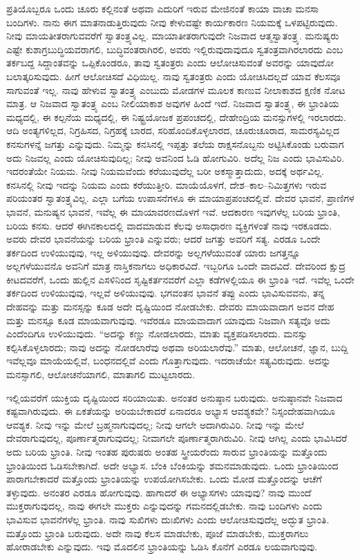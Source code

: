 ಪ್ರತಿಯೊಬ್ಬರೂ ಒಂದು ಚೂರು ಕಲ್ಲಿನಂತೆ ಅಥವಾ ಎದುರಿಗೆ ಇರುವ ಮೇಜಿನಂತೆ ಕಾಯಾ ವಾಚಾ ಮನಸಾ ಬಂದಿಗಳು. ನಾನು ಈಗ ಮಾತನಾಡುತ್ತಿರುವುದು ನೀವು ಕೇಳುವಷ್ಟೇ ಕಾರ್ಯಕಾರಣ ನಿಯಮಕ್ಕೆ ಒಳಪಟ್ಟಿರುವುದು. ನೀವು ಮಾಯತೀತರಾಗುವವರೆಗೆ ಸ್ವಾತಂತ್ರ್ಯವಿಲ್ಲ. ಮಾಯಾತೀತರಾಗುವುದೇ ನಿಜವಾದ ಆತ್ಮಸ್ವಾತಂತ್ರ್ಯ. ಮನುಷ್ಯರು ಎಷ್ಟೇ ಕುಶಾಗ್ರಬುದ್ಧಿಯವರಾಗಲಿ, ಬುದ್ಧಿವಂತರಾಗಿರಲಿ, ಅವರು ಇಲ್ಲಿರುವುದಾವುದೂ ಸ್ವತಂತ್ರವಾಗಿರಲಾರದು ಎಂಬ ತರ್ಕಬದ್ದ ಸಿದ್ದಾಂತವನ್ನು ಒಪ್ಪಿಕೊಂಡರೂ, ತಾವು ಸ್ವತಂತ್ರರು ಎಂದು ಆಲೋಚಿಸುವಂತೆ ಅವರನ್ನು ಯಾವುದೋ ಬಲಾತ್ಕರಿಸುವುದು. ಹೀಗೆ ಆಲೋಚಿಸದೆ ವಿಧಿಯಿಲ್ಲ. ನಾವು ಸ್ವತಂತ್ರರು ಎಂದು ಯೋಚಿಸಿದಲ್ಲದೆ ಯಾವ ಕೆಲಸವೂ ಸಾಗುವಂತೆ ಇಲ್ಲ. ನಾವು ಹೇಳುವ ಸ್ವಾತಂತ್ರ್ಯ ಎಂಬುದು ಮೋಡಗಳ ಮೂಲಕ ಕಾಣುವ ನೀಲಾಕಾಶದ ಕ್ಷಣಿಕ ನೋಟ ಮಾತ್ರ. ಆ ನಿಜವಾದ ಸ್ವಾತಂತ್ರ್ಯ ಎಂಬ ನೀಲಿಯಾಕಾಶ ಅವುಗಳ ಹಿಂದೆ ಇದೆ. ನಿಜವಾದ ಸ್ವಾತಂತ್ರ್ಯ, ಈ ಭ್ರಾಂತಿಯ ಮಧ್ಯದಲ್ಲಿ, ಈ ಕಲ್ಪನೆಯ ಮಧ್ಯದಲ್ಲಿ, ಈ ನಿಷ್ಟ್ರಯೋಜಕ ಪ್ರಪಂಚದಲ್ಲಿ, ದೇಹೇಂದ್ರಿಯ ಮನಸ್ಸುಗಳಲ್ಲಿ ಇರಲಾರದು. ಆದಿ ಅಂತ್ಯಗಳಿಲ್ಲದ, ನಿಗ್ರಹಿಸದ, ನಿಗ್ರಹಕ್ಕೆ ಬಾರದ, ಸರಿಹೊಂದಿಕೊಳ್ಳಲಾರದ, ಚೂರುಚೂರಾದ, ಸಾಮರಸ್ಯವಿಲ್ಲದ ಕನಸುಗಳನ್ನೆ ಜಗತ್ತು ಎನ್ನುವುದು. ನಿಮ್ಮನ್ನು ಕನಸಿನಲ್ಲಿ ಇಪ್ಪತ್ತು ತಲೆಯ ರಾಕ್ಷಸನೊಬ್ಬನು ಅಟ್ಟಿಸಿಕೊಂಡು ಬರುವಾಗ ಅದು ನಿಜವಲ್ಲ ಎಂದು ಯೋಚಿಸುವುದಿಲ್ಲ; ನೀವು ಅವನಿಂದ ಓಡಿ ಹೋಗುವಿರಿ. ಅದೆಲ್ಲ ನಿಜ ಎಂದು ಭಾವಿಸುವಿರಿ. ಇದರಂತೆಯೇ ನಿಯಮ. ನೀವು ನಿಯಮವೆಂದು ಕರೆಯುವುದೆಲ್ಲ ಬರೀ ಅಕಸ್ಮಾತ್ತಾದುದು, ಅದಕ್ಕೆ ಅರ್ಥವಿಲ್ಲ. ಕನಸಿನಲ್ಲಿ ನೀವು ಇದನ್ನು ನಿಯಮ ಎಂದು ಕರೆಯುತ್ತೀರಿ. ಮಾಯೆಯೊಳಗೆ, ದೇಶ–ಕಾಲ–ನಿಮಿತ್ತಗಳು ಇರುವ ಪರಿಯಂತರ ಸ್ವಾತಂತ್ರ್ಯವಿಲ್ಲ. ಎಲ್ಲಾ ಬಗೆಯ ಉಪಾಸನೆಗಳೂ ಈ ಮಾಯಾಪ್ರಪಂಚದಲ್ಲಿವೆ. ದೇವರ ಭಾವನೆ, ಪ್ರಾಣಿಗಳ ಭಾವನೆ, ಮನುಷ್ಯನ ಭಾವನೆ, ಇವೆಲ್ಲ ಈ ಮಾಯಾವರಣದೊಳಗೆ ಇವೆ. ಆದಕಾರಣ ಇವುಗಳೆಲ್ಲ ಬರಿಯ ಭ್ರಾಂತಿ, ಬರಿಯ ಕನಸು. ಆದರೆ ಈಗಿನ\break ಕಾಲದಲ್ಲಿ ವಾದಮಾಡುವ ಕೆಲವು ಅಸಾಧಾರಣ ವ್ಯಕ್ತಿಗಳಂತೆ ನಾವು ಇರಕೂಡದು. ಅವರು ದೇವರ ಭಾವನೆಯನ್ನು ಬರಿಯ ಭ್ರಾಂತಿ ಎನ್ನುವರು; ಆದರೆ ಜಗತ್ತು ಅವರಿಗೆ ಸತ್ಯ. ಎರಡೂ ಒಂದೇ ತರ್ಕದಿಂದ ಉಳಿಯುವುವು, ಇಲ್ಲ ಅಳಿಯುವುವು. ದೇವರನ್ನು ಅಲ್ಲಗಳೆಯುವಂತೆ ಯಾರು ಜಗತ್ತನ್ನೂ ಅಲ್ಲಗಳೆಯುವನೊ ಅವನಿಗೆ ಮಾತ್ರ ನಾಸ್ತಿಕನಾಗಲು ಅಧಿಕಾರವಿದೆ. ಇಬ್ಬರಿಗೂ ಒಂದೇ ವಾದವಿದೆ. ದೇವರಿಂದ ಕ್ಷುದ್ರ ಕೀಟದವರೆಗೆ, ಒಂದು ಹುಲ್ಲಿನ ಎಸಳಿನಿಂದ ಸೃಷ್ಟಿಕರ್ತನವರೆಗೆ ಎಲ್ಲಾ ಕಡೆಗಳಲ್ಲಿಯೂ ಈ ಭ್ರಾಂತಿ ಇದೆ. ಇವೆಲ್ಲ ಒಂದೇ ತರ್ಕದಿಂದ ಉಳಿಯುವುವು, ಇಲ್ಲವೆ ಅಳಿಯುವುವು. ಭಗವಂತನ ಭಾವನೆ ತಪ್ಪು ಎಂದು ಭಾವಿಸುವವನು, ತನ್ನ ದೇಹವನ್ನು ಮತ್ತು ಮನಸ್ಸನ್ನು ಕೂಡ ಅದೇ ದೃಷ್ಟಿಯಿಂದ ನೋಡಬೇಕು. ದೇವರು ಮಾಯವಾದಾಗ ಅವನ ದೇಹ ಮತ್ತು ಮನಸ್ಸೂ ಕೂಡ ಮಾಯವಾಗುವುವು. ಇವೆರಡೂ ಮಾಯವಾದಾಗ ಯಾವುದು ನಿಜವಾಗಿ ಸತ್ಯವೊ ಅದು ಎಂದೆಂದಿಗೂ ಉಳಿಯುವುದು. “ಅದನ್ನು ಕಣ್ಣು ನೋಡಲಾರದು, ಮಾತು ವ್ಯಕ್ತಪಡಿಸಲಾರದು. ಮನಸ್ಸು ಕಲ್ಪಿಸಿಕೊಳ್ಳಲಾರದು; ನಾವು ಅದನ್ನು ನೋಡಲಾರೆವು ಅಥವಾ ಅರಿಯಲಾರೆವು.'' ಮಾತು, ಆಲೋಚನೆ, ಜ್ಞಾನ, ಬುದ್ದಿ ಇವೆಲ್ಲವೂ ಮಾಯೆಯಲ್ಲಿವೆ, ಬಂಧನದಲ್ಲಿವೆ ಎಂದು ಗೊತ್ತಾಗುವುದು. ಇದರಾಚೆಯೇ ಸತ್ಯವಿರುವುದು. ಅದನ್ನು ಮನಸ್ಸಾಗಲಿ, ಆಲೋಚನೆಯಾಗಲಿ, ಮಾತಾಗಲಿ ಮುಟ್ಟಲಾರದು.

ಇಲ್ಲಿಯವರೆಗೆ ಯುಕ್ತಿಯ ದೃಷ್ಟಿಯಿಂದ ಸರಿಯಾಯಿತು. ಅನಂತರ ಅನುಷ್ಠಾನ ಬರುವುದು. ಅನುಷ್ಠಾನವೇ ನಿಜವಾದ ಕಷ್ಟವಾಗಿರುವುದು. ಈ ಏಕತೆಯನ್ನು ಅರಿಯಬೇಕಾದರೆ ಏನಾದರೂ ಅಭ್ಯಾಸ ಆವಶ್ಯಕವೇ? ನಿಸ್ಸಂದೇಹವಾಗಿಯೂ ಆವಶ್ಯಕ. ನೀವು ಇನ್ನು ಮೇಲೆ ಬ್ರಹ್ಮನಾಗುವುದಲ್ಲ; ನೀವು ಆಗಲೇ ಅದಾಗಿರುವಿರಿ. ನೀವು ಇನ್ನು ಮೇಲೆ ದೇವರಾಗುವುದಲ್ಲ, ಪೂರ್ಣಾತ್ಮರಾಗುವುದಲ್ಲ; ನೀವಾಗಲೇ ಪೂರ್ಣಾತ್ಮರಾಗಿರುವಿರಿ. ನೀವು ಆಗಿಲ್ಲ ಎಂದು ಭಾವಿಸಿದರೆ ಅದು ಬರಿಯ ಭ್ರಾಂತಿ. ನೀವು ಇಂತಹ ಪುರುಷರು ಅಂತಹ ಸ್ತ್ರೀಯರೆಂದು ಸಾರುವ ಭ್ರಾಂತಿಯನ್ನು ಮತ್ತೊಂದು ಭ್ರಾಂತಿಯಿಂದ ಓಡಿಸಬೇಕಾಗಿದೆ. ಅದೇ ಅಭ್ಯಾಸ. ಬೆಂಕಿ ಬೆಂಕಿಯನ್ನು ಶಮನಮಾಡುವುದು. ಒಂದು ಭ್ರಾಂತಿಯಿಂದ ಪಾರಾಗಬೇಕಾದರೆ ಮತ್ತೊಂದು ಭ್ರಾಂತಿಯನ್ನು ಉಪಯೋಗಿಸಬೇಕು. ಒಂದು ಮೋಡ ಮತ್ತೊಂದನ್ನು ಆಚೆಗೆ ತಳ್ಳುವುದು. ಅನಂತರ ಎರಡೂ ಹೋಗುವುವು. ಹಾಗಾದರೆ ಈ ಅಭ್ಯಾಸಗಳು ಯಾವುವು? ನಾವು ಮುಂದೆ ಮುಕ್ತರಾಗುವುದಲ್ಲ, ನಾವು ಈಗಲೇ ಮುಕ್ತರು ಎನ್ನುವುದನ್ನು ಗಮನದಲ್ಲಿಡಬೇಕು. ನಾವು ಬಂದಿಗಳು ಎಂದು ಭಾವಿಸುವ ಭಾವನೆಗಳೆಲ್ಲ ಭ್ರಾಂತಿ. ನಾವು ಸುಖಿಗಳು ದುಃಖಿಗಳು ಎಂದು ಆಲೋಚಿಸುವುದೆಲ್ಲ ಅದ್ಭುತ ಭ್ರಾಂತಿ. ಮತ್ತೊಂದು ಭ್ರಾಂತಿ ಬರುವುದು. ಅದೇ ನಾವು ಕೆಲಸ ಮಾಡಬೇಕು, ಪೂಜೆ ಮಾಡಬೇಕು, ಮುಕ್ತರಾಗಲು ಹೋರಾಡಬೇಕು ಎನ್ನುವುದು. ಇವು ಮೊದಲಿನ ಭ್ರಾಂತಿಯನ್ನು ಓಡಿಸಿ ಕೊನೆಗೆ ಎರಡೂ ಲಯವಾಗುವುವು.

